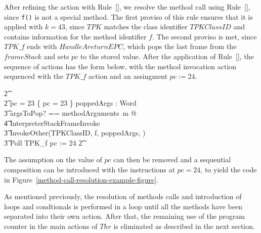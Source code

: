 After refining the action with
Rule~[], we resolve the method call
using Rule~[], since \texttt{f()}
is not a special method.
The first proviso of this rule ensures that it is applied with
$k = 43$, since $TPK$ matches the class identifier $TPKClassID$ and
contains information for the method identifier $f$.
The second proviso is met, since $TPK\_f$ ends with
$HandleAreturnEPC$, which pops the last frame from the $frameStack$
and sets $pc$ to the stored value.
After the application of Rule~[],
the sequence of actions has the form below, with the method invocation
action sequenced with the $TPK\_f$ action and an assingment
$pc := 24$.
\begin{circusaction}
  \t2 {} \cdots {} \\
  \t2 {} \circelse pc = 23 \circthen \{ pc = 23 \} \circseq \circvar poppedArgs : \seq Word \circspot \\
  \t3 \lschexpract \exists argsToPop? == methodArguments~m @ \\
  \t4 InterpreterStackFrameInvoke \rschexpract \circseq \\
  \t3 InvokeOther(TPKClassID, f, poppedArgs, \true) \circseq \\
  \t3 Poll \circseq TPK\_f \circseq pc := 24
  \t2 {} \cdots {}
\end{circusaction}
The assumption on the value of $pc$ can then be removed and a
sequential composition can be introduced with the instructions at
$pc = 24$, to yield the code in
Figure~\ref{method-call-resolution-example-figure}.

As mentioned previously, the resolution of methods calls and
introduction of loops and condtionals is performed in a loop until all
the methods have been separated into their own action.
After that, the remaining use of the program counter in the main
actions of $Thr$ is eliminated as described in the next section.